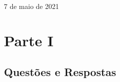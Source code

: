 \documentclass[11pt]{article}
\begin{document}
\begin{titlepage}
\begin{center}
\begin{figure}[hbt!]
                \centering
                \captionsetup{A89572}
            \endminipage\hfill
                \centering
                \captionsetup{A89597}
            \endminipage
        \end{figure}
        
       \vspace{8cm}
        
        7 de maio de 2021
        
    \end{center}
\end{titlepage}

\tableofcontents
\thispagestyle{empty}
\cleardoublepage

\setcounter{page}{1}

\section{Parte I}
\subsection{Questões e Respostas}
\vspace{0.5cm}
\end{document}
